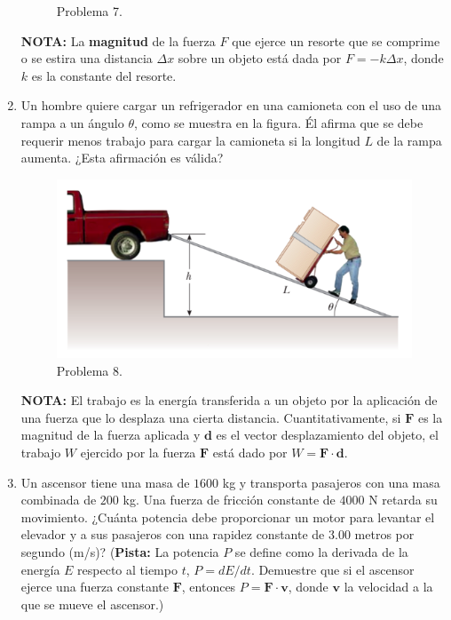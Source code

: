 \documentclass{article}
\begin{document}
\begin{enumerate}
\begin{figure}[H]
\caption{Problema 7.}
\end{figure}

\textbf{NOTA:} La \textbf{magnitud} de la fuerza $F$ que ejerce un resorte que se comprime o se estira una distancia $\Delta x$ sobre un objeto está dada por $F=-k\Delta x$, donde $k$ es la constante del resorte. 


\item Un hombre quiere cargar un refrigerador en una camioneta con el uso de una rampa a un ángulo $\theta$, como se muestra en la figura. Él afirma que se debe requerir menos trabajo para cargar la camioneta si la longitud $L$ de la rampa aumenta. ¿Esta afirmación es válida?


\begin{figure}[H]
\centering
\includegraphics[scale=0.5]{problema_8.png}
\caption{Problema 8.}
\end{figure}


\textbf{NOTA:} El trabajo es la energía transferida a un objeto por la aplicación de una fuerza que lo desplaza una cierta distancia. Cuantitativamente, si $\textbf{F}$ es la magnitud de la fuerza aplicada y $\textbf{d}$ es el vector desplazamiento del objeto, el trabajo $W$ ejercido por la fuerza $\textbf{F}$ está dado por $W=\textbf{F}\cdot\textbf{d}$.

\item Un ascensor tiene una masa de $1600$ kg y transporta pasajeros con una masa combinada de $200$ kg. Una
fuerza de fricción constante de $4000$ N retarda su movimiento. ¿Cuánta potencia debe proporcionar un motor para levantar el elevador y a sus pasajeros con una rapidez constante de $3$.$00$ metros por segundo (m/s)? (\textbf{Pista:} La potencia $P$ se define como la derivada de la energía $E$ respecto al tiempo $t$, $P=dE/dt$. Demuestre que si el ascensor ejerce una fuerza constante $\textbf{F}$, entonces $P=\textbf{F}\cdot \textbf{v}$, donde $\textbf{v}$ la velocidad a la que se mueve el ascensor.)



\end{enumerate}
\end{document}
